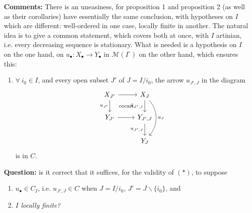 \documentclass[11pt]{article}
\newcommand{\msp}[1]{\marginpar{\footnotesize [#1]}}
\newcommand{\cocart}{\text{\scriptsize cocart.}}
\begin{document}
\textbf{Comments:} There is an uneasiness, for proposition 1 and proposition 2 (as well as their corollaries) have essentially the same conclusion, with hypotheses on $I$ which are \msp{page 23} different: well-ordered in one case, locally finite in another. The natural idea is to give a common statement, which covers both at once, with $I$ artinian, i.e. every decreasing sequence is stationary. What is needed is a hypothesis on $I$ on the one hand, on $u_\bullet : X_\bullet \longrightarrow Y_\bullet$ in $\mathcal{M}(I^\circ)$ on the other hand, which ensures this:

\begin{enumerate}
\item[$(*)$] $\forall\ i_0 \in I$, and every open subset $J'$ of $J = I/i_0$, the arrow $u_{J',J}$ in the diagram
\[
\begin{tikzcd}
X_{J'} \arrow[r] \arrow[d, "u_{J'}"'] \arrow[dr, phantom, "\cocart"] & X_J \arrow[d, "\tilde{u}_{J',J}"'] \arrow[dd, bend left=40, "u_J"] \\
Y_{J'} \arrow[r] & Y_{J',J} \arrow[d, "u_{J',J}"'] \\
 & Y_J
\end{tikzcd}
\]
is in $C$.
\end{enumerate}

\textbf{Question:} is it correct that it suffices, for the validity of $(*)$, to suppose %
\begin{enumerate}
\item[a)] $u_\bullet \in C_I$, i.e. $u_{J',J} \in C$ when $J = I/i_0$, $J' = J \backslash \{i_0\}$, and
\item[b)] \textit{$I$ locally finite?}
\end{enumerate}
\end{document}
